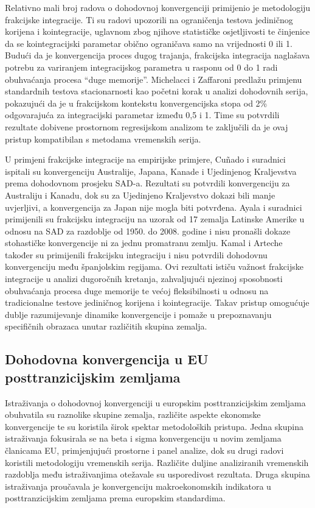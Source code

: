 \documentclass{crebsshr}
\begin{document}
    Relativno mali broj radova o dohodovnoj konvergenciji primijenio je metodologiju frakcijske integracije. Ti su radovi upozorili na ograničenja testova jediničnog korijena i kointegracije, uglavnom zbog njihove statističke osjetljivosti te činjenice da se kointegracijski parametar obično ograničava samo na vrijednosti 0 ili 1. Budući da je konvergencija proces dugog trajanja, frakcijska integracija naglašava potrebu za variranjem integracijskog parametra u rasponu od 0 do 1 radi obuhvaćanja procesa ``duge memorije''. Michelacci i Zaffaroni \citeyearpar{Michelacci2000} predlažu primjenu standardnih testova stacionarnosti kao početni korak u analizi dohodovnih serija, pokazujući da je u frakcijskom kontekstu konvergencijska stopa od 2\% odgovarajuća za integracijski parametar između 0,5 i 1. Time su potvrdili rezultate dobivene prostornom regresijskom analizom te zaključili da je ovaj pristup kompatibilan s metodama vremenskih serija.
    
    U primjeni frakcijske integracije na empirijske primjere, Cuñado i suradnici \citeyearpar{Cuñado2003} ispitali su konvergenciju Australije, Japana, Kanade i Ujedinjenog Kraljevstva prema dohodovnom prosjeku SAD-a. Rezultati su potvrdili konvergenciju za Australiju i Kanadu, dok su za Ujedinjeno Kraljevstvo dokazi bili manje uvjerljivi, a konvergencija za Japan nije mogla biti potvrđena. Ayala i suradnici \citeyearpar{Ayala2012} primijenili su frakcijsku integraciju na uzorak od 17 zemalja Latinske Amerike u odnosu na SAD za razdoblje od 1950. do 2008. godine i nisu pronašli dokaze stohastičke konvergencije ni za jednu promatranu zemlju. Kamal i Arteche \citeyearpar{Kamal2014} također su primijenili frakcijsku integraciju i nisu potvrdili dohodovnu konvergenciju među španjolskim regijama. Ovi rezultati ističu važnost frakcijske integracije u analizi dugoročnih kretanja, zahvaljujući njezinoj sposobnosti obuhvaćanja procesa duge memorije te većoj fleksibilnosti u odnosu na tradicionalne testove jediničnog korijena i kointegracije. Takav pristup omogućuje dublje razumijevanje dinamike konvergencije i pomaže u prepoznavanju specifičnih obrazaca unutar različitih skupina zemalja.
    
    \subsection{Dohodovna konvergencija u EU posttranzicijskim zemljama}
    
    Istraživanja o dohodovnoj konvergenciji u europskim posttranzicijskim zemljama obuhvatila su raznolike skupine zemalja, različite aspekte ekonomske konvergencije te su koristila širok spektar metodoloških pristupa. Jedna skupina istraživanja fokusirala se na beta i sigma konvergenciju u novim zemljama članicama EU, primjenjujući prostorne i panel analize, dok su drugi radovi koristili metodologiju vremenskih serija. Različite duljine analiziranih vremenskih razdoblja među istraživanjima otežavale su usporedivost rezultata. Druga skupina istraživanja proučavala je konvergenciju makroekonomskih indikatora u posttranzicijskim zemljama prema europskim standardima.
    
\end{document}
